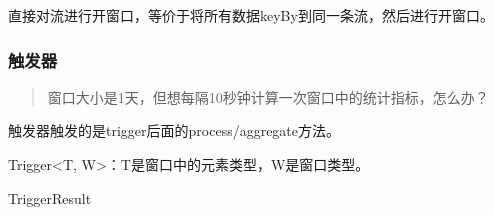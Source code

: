 \begin{Shaded}
\begin{Highlighting}[]
  \OperatorTok{(}\OperatorTok{(}\OperatorTok{))}
  \OperatorTok{(} \OperatorTok{(}\OperatorTok{))}
\end{Highlighting}
\end{Shaded}

直接对流进行开窗口，等价于将所有数据keyBy到同一条流，然后进行开窗口。

\begin{Shaded}
\begin{Highlighting}[]
  \OperatorTok{(}\OperatorTok{{-}\textgreater{}} \OperatorTok{)}
  \OperatorTok{()}
  \OperatorTok{(} \OperatorTok{())}
\end{Highlighting}
\end{Shaded}

\hypertarget{ux89e6ux53d1ux5668}{%
\subsubsection{触发器}\label{ux89e6ux53d1ux5668}}

\begin{quote}
窗口大小是1天，但想每隔10秒钟计算一次窗口中的统计指标，怎么办？
\end{quote}

\begin{Shaded}
\begin{Highlighting}[]
  \OperatorTok{()}
  \OperatorTok{()}
  \OperatorTok{()}
  \OperatorTok{()/}\OperatorTok{()}
\end{Highlighting}
\end{Shaded}

触发器触发的是trigger后面的process/aggregate方法。

Trigger\textless T, W\textgreater：T是窗口中的元素类型，W是窗口类型。

TriggerResult

